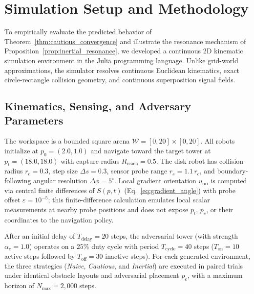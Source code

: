 \documentclass[12pt, a4paper]{article}
\begin{document}
\section{Simulation Setup and Methodology}
\label{sec:simulation}
To empirically evaluate the predicted behavior of Theorem~\ref{thm:cautious_convergence} and illustrate the resonance mechanism of Proposition~\ref{prop:inertial_resonance}, we developed a continuous 2D kinematic simulation environment in the Julia programming language. Unlike grid-world approximations, the simulator resolves continuous Euclidean kinematics, exact circle-rectangle collision geometry, and continuous superposition signal fields.

\subsection{Kinematics, Sensing, and Adversary Parameters}
The workspace is a bounded square arena $\mathcal{W} = [0, 20] \times [0, 20]$. All robots initialize at $p_0 = (2.0, 1.0)$ and navigate toward the target tower at $p_t = (18.0, 18.0)$ with capture radius $R_{\text{reach}} = 0.5$. The disk robot has collision radius $r_c = 0.3$, step size $\Delta s = 0.3$, sensor probe range $r_s = 1.1\,r_c$, and boundary-following angular resolution $\Delta\phi = 5^\circ$. Local gradient orientation $u_{\text{ori}}$ is computed via central finite differences of $S(p, t)$ (Eq.~\eqref{eq:gradient_angle}) with probe offset $\varepsilon = 10^{-5}$; this finite-difference calculation emulates local scalar measurements at nearby probe positions and does not expose $p_t$, $p_e$, or their coordinates to the navigation policy.

After an initial delay of $T_{\text{delay}} = 20$ steps, the adversarial tower (with strength $\alpha_e = 1.0$) operates on a $25\%$ duty cycle with period $T_{\text{cycle}} = 40$ steps ($T_{\text{on}} = 10$ active steps followed by $T_{\text{off}} = 30$ inactive steps). For each generated environment, the three strategies (\textit{Naive}, \textit{Cautious}, and \textit{Inertial}) are executed in paired trials under identical obstacle layouts and adversarial placement $p_e$, with a maximum horizon of $N_{\max} = 2,000$ steps.
\end{document}
